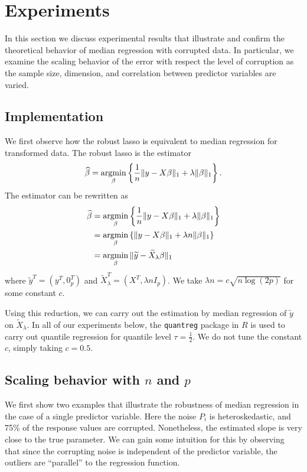 
\section{Experiments}
\label{sec:experiments}

In this section we discuss experimental results that illustrate and confirm the theoretical behavior of
median regression with corrupted data. In particular, we examine the scaling behavior of the error
with respect the level of corruption as the sample size, dimension, and correlation between predictor variables
are varied.

\subsection{Implementation}

We first observe how the robust lasso is equivalent to median regression for transformed data. The robust lasso is the  estimator
\begin{align*}
  \hat\beta = \argmin_\beta \left\{ \frac{1}{n}\|y - X\beta\|_1 + \lambda \|\beta\|_1\right\}.
\end{align*}
The estimator can be rewritten as
\begin{align*}
  \hat\beta &= \argmin_\beta \left\{ \frac{1}{n}\|y - X\beta\|_1 + \lambda \|\beta\|_1 \right\} \\
  &= \argmin_\beta \left\{ \|y - X\beta\|_1 + \lambda n \|\beta\|_1 \right\} \\
  &= \argmin_\beta \|\tilde y - \tilde X_\lambda \beta\|_1
\end{align*}
where $\tilde y^T = (y^T, 0_p^T)$  and $\tilde X_\lambda^T = (X^T, \lambda n I_p)$.
We take $\lambda n = c\sqrt{n \log (2p)}$ for some constant $c$.

Using this reduction, we can carry out the estimation by
median regression of $\tilde y$ on $\tilde X_\lambda$. In all of our experiments below, the \texttt{quantreg} package in $R$ is used to carry out quantile regression for quantile level $\tau = \frac{1}{2}$. We do not tune the constant $c$, simply taking $c=0.5$.



\subsection{Scaling behavior with $n$ and $p$}


We first show two examples that illustrate the robustness of median regression
in the case of a single predictor variable. Here the noise $P_i$ is heteroskedastic, and 75\% of the response values are corrupted. Nonetheless, the estimated slope is very close to the true parameter. We can gain some intuition for this by observing that since the corrupting noise is independent of the predictor variable, the outliers are ``parallel'' to the regression function. 

